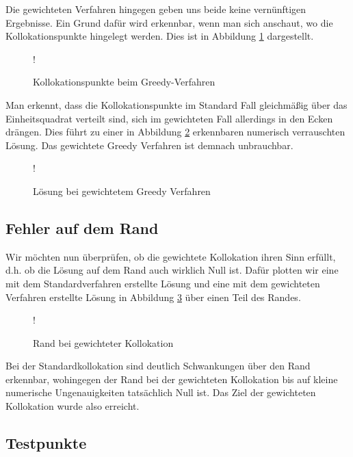 Die gewichteten Verfahren hingegen geben uns beide keine vernünftigen Ergebnisse. Ein Grund dafür wird erkennbar, wenn man sich anschaut, wo die Kollokationspunkte hingelegt werden. Dies ist in Abbildung \ref{fig:greedy-points} dargestellt.
\begin{figure}[ht]
\centering
\resizebox {\columnwidth} {!} {

}
\caption{Kollokationspunkte beim Greedy-Verfahren}
\label{fig:greedy-points}
\end{figure}

Man erkennt, dass die Kollokationspunkte im Standard Fall gleichmäßig über das Einheitsquadrat verteilt sind, sich im gewichteten Fall allerdings in den Ecken drängen. Dies führt zu einer in Abbildung \ref{fig:greedy-verrauscht} erkennbaren numerisch verrauschten Lösung. Das gewichtete Greedy Verfahren ist demnach unbrauchbar.

\begin{figure}[ht]
\centering
\resizebox {\columnwidth} {!} {

}
\caption{Lösung bei gewichtetem Greedy Verfahren}
\label{fig:greedy-verrauscht}
\end{figure}

\subsection{Fehler auf dem Rand}

Wir möchten nun überprüfen, ob die gewichtete Kollokation ihren Sinn erfüllt, d.h. ob die Lösung auf dem Rand auch wirklich Null ist. Dafür plotten wir eine mit dem Standardverfahren erstellte Lösung und eine mit dem gewichteten Verfahren erstellte Lösung in Abbildung \ref{fig:rand-vergleich} über einen Teil des Randes.

\begin{figure}[ht]
\centering
\resizebox {\columnwidth} {!} {

}
\caption{Rand bei gewichteter Kollokation}
\label{fig:rand-vergleich}
\end{figure}

Bei der Standardkollokation sind deutlich Schwankungen über den Rand erkennbar, wohingegen der Rand bei der gewichteten Kollokation bis auf kleine numerische Ungenauigkeiten tatsächlich Null ist. Das Ziel der gewichteten Kollokation wurde also erreicht.

\subsection{Testpunkte}

